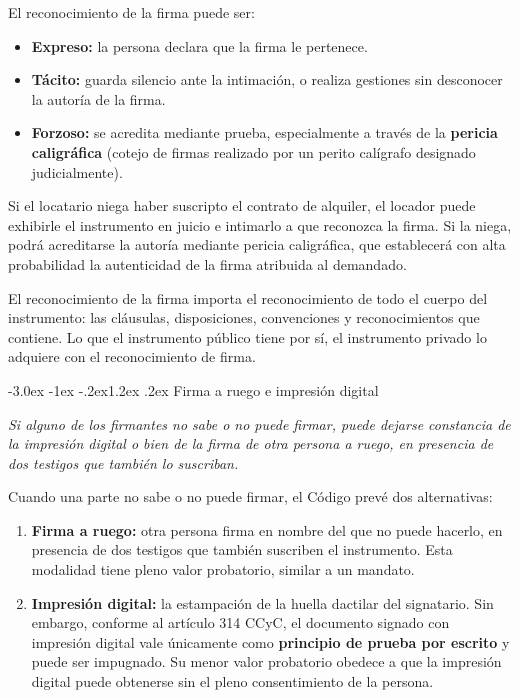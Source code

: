 \documentclass[12pt,oneside]{book}
\makeatletter
\renewcommand\section{\@startsection{section}{1}{\z@}%
  {-3.0ex \@plus -1ex \@minus -.2ex}{1.2ex \@plus .2ex}%
  {\normalfont\large\bfseries\color{acento}}}
\makeatother
\begin{document}
El reconocimiento de la firma puede ser:

\begin{itemize}
    \item \textbf{Expreso:} la persona declara que la firma le pertenece.
    \item \textbf{Tácito:} guarda silencio ante la intimación, o realiza gestiones sin desconocer la autoría de la firma.
    \item \textbf{Forzoso:} se acredita mediante prueba, especialmente a través de la \textbf{pericia caligráfica} (cotejo de firmas realizado por un perito calígrafo designado judicialmente).
\end{itemize}

\begin{ejemplo}
Si el locatario niega haber suscripto el contrato de alquiler, el locador puede exhibirle el instrumento en juicio e intimarlo a que reconozca la firma. Si la niega, podrá acreditarse la autoría mediante pericia caligráfica, que establecerá con alta probabilidad la autenticidad de la firma atribuida al demandado.
\end{ejemplo}

El reconocimiento de la firma importa el reconocimiento de todo el cuerpo del instrumento: las cláusulas, disposiciones, convenciones y reconocimientos que contiene. Lo que el instrumento público tiene por sí, el instrumento privado lo adquiere con el reconocimiento de firma.

\section{Firma a ruego e impresión digital}

\begin{regla}
\textit{Si alguno de los firmantes no sabe o no puede firmar, puede dejarse constancia de la impresión digital o bien de la firma de otra persona a ruego, en presencia de dos testigos que también lo suscriban.}
\end{regla}

Cuando una parte no sabe o no puede firmar, el Código prevé dos alternativas:

\begin{enumerate}
    \item \textbf{Firma a ruego:} otra persona firma en nombre del que no puede hacerlo, en presencia de dos testigos que también suscriben el instrumento. Esta modalidad tiene pleno valor probatorio, similar a un mandato.

    \item \textbf{Impresión digital:} la estampación de la huella dactilar del signatario. Sin embargo, conforme al artículo 314 CCyC, el documento signado con impresión digital vale únicamente como \textbf{principio de prueba por escrito} y puede ser impugnado. Su menor valor probatorio obedece a que la impresión digital puede obtenerse sin el pleno consentimiento de la persona.
\end{enumerate}
\end{document}
